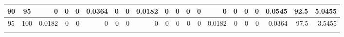 \begin{table}[ht]
\begin{adjustbox}{width = \textwidth, center}
\begin{tabular}{|cc|r|r|r|r|r|r|r|r|r|r|r|r|r|r|r|rrr|}
        \cellcolor[HTML]{C8E4BE}90           & \cellcolor[HTML]{D9EAD3}95          & 0                                              & 0                                              & 0                                              & \cellcolor[HTML]{8FD2B1}0.0364                 & 0                                              & 0                                              & \cellcolor[HTML]{C7E9D8}0.0182                 & 0                                               & 0                                               & 0                                               & 0                                               & 0                                               & 0                                               & 0                                               & 0                                               & \multicolumn{1}{r|}{\cellcolor[HTML]{D9D2E9}0.0545}                                   & \multicolumn{1}{r|}{\cellcolor[HTML]{D9D2E9}92.5}                       & \cellcolor[HTML]{D9D2E9}5.0455                                                              \\ \hline
        \rowcolor[HTML]{FFFFFF} 
        \cellcolor[HTML]{C8E4BE}95           & \cellcolor[HTML]{D9EAD3}100         & \cellcolor[HTML]{C7E9D8}0.0182                 & 0                                              & 0                                              & 0                                              & 0                                              & 0                                              & 0                                              & 0                                               & 0                                               & 0                                               & 0                                               & \cellcolor[HTML]{C7E9D8}0.0182                  & 0                                               & 0                                               & 0                                               & \multicolumn{1}{r|}{\cellcolor[HTML]{D9D2E9}0.0364}                                   & \multicolumn{1}{r|}{\cellcolor[HTML]{D9D2E9}97.5}                       & \cellcolor[HTML]{D9D2E9}3.5455                                                              \\ \hline
        \rowcolor[HTML]{FFFFFF} 

\end{tabular}
\end{adjustbox}
\end{table}
